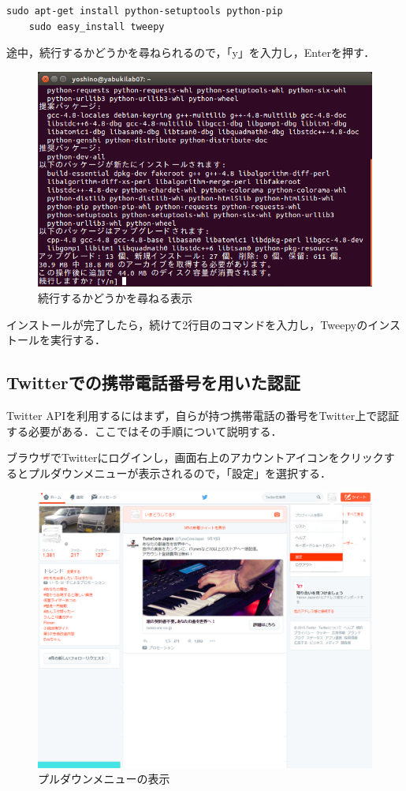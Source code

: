 \begin{lstlisting}[caption={}, label={}]
	sudo apt-get install python-setuptools python-pip
	sudo easy_install tweepy
\end{lstlisting}
	
途中，続行するかどうかを尋ねられるので，「y」を入力し，Enterを押す．
	
\begin{figure}[H]
\centering
\includegraphics[width=13cm]{pythoninstall.PNG}
\caption{続行するかどうかを尋ねる表示}\label{pythoninstall}
\end{figure}

インストールが完了したら，続けて2行目のコマンドを入力し，Tweepyのインストールを実行する．
	
\subsection{Twitterでの携帯電話番号を用いた認証}
Twitter APIを利用するにはまず，自らが持つ携帯電話の番号をTwitter上で認証する必要がある．ここではその手順について説明する．

ブラウザでTwitterにログインし，画面右上のアカウントアイコンをクリックするとプルダウンメニューが表示されるので，「設定」を選択する．

\begin{figure}[H]
\centering
\includegraphics[width=13cm]{TwitterHome.png}
\caption{プルダウンメニューの表示}\label{pulldown}
\end{figure}

